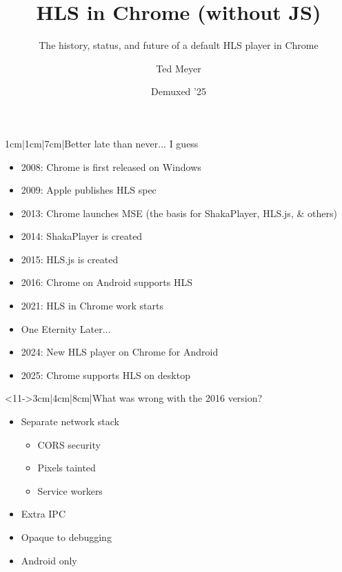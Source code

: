 \documentclass{beamer}
\title{HLS in Chrome (without JS)}
\subtitle{The history, status, and future of a default HLS player in Chrome}
\date[2025/09/15]{Demuxed '25}
\author[Ted]{Ted Meyer}
\begin{document}
\begin{frame}
    \settitleboxwidth{3.5cm}
    \titlepage
\end{frame}

\begin{frame}
    \begin{block}{1cm|1cm|7cm|Better late than never... I guess}
        \begin{itemize}[<+->]
            \item<1->{ 2008: Chrome is first released on Windows}
            \item<2->{ 2009: Apple publishes HLS spec}
            \item<3->{ 2013: Chrome launches MSE (the basis for ShakaPlayer, HLS.js, \& others)}
            \item<4->{ 2014: ShakaPlayer is created} %
            \item<5->{ 2015: HLS.js is created} %
            \item<6->{ 2016: Chrome on Android supports HLS}
            \item<7->{ 2021: HLS in Chrome work starts}
            \item<8> {   One Eternity Later... }
            \item<9->{ 2024: New HLS player on Chrome for Android}
            \item<10->{ 2025: Chrome supports HLS on desktop}
        \end{itemize}
    \end{block}

    \begin{block}<11->{3cm|4cm|8cm|What was wrong with the 2016 version?}
        \begin{itemize}[<+->]
            \item<12->Separate network stack
            \begin{itemize}[<+->]
                \item<13-> CORS security
                \item<14-> Pixels tainted
                \item<15-> Service workers
            \end{itemize}
            \item<16-> Extra IPC
            \item<17-> Opaque to debugging
            \item<18-> Android only
        \end{itemize}
    \end{block}
\end{frame}
\end{document}
